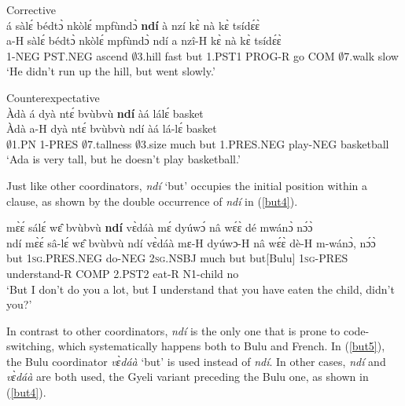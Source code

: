 \begin{exe}
\ex \label{but2} Corrective\\
  \glll     á sàlɛ́ bédtɔ̀ nkòlɛ́ mpfùndɔ̀ {\bfseries ndí} à nzí kɛ̀ nà kɛ̀ tsídɛ́ɛ̀ \\
              a-H sàlɛ́ bédtɔ̀ nkòlɛ́ mpfùndɔ̀ ndí a nzî-H kɛ̀ nà kɛ̀ tsídɛ́ɛ̀ \\
               1-NEG PST.NEG ascend $\emptyset$3.hill fast but 1.PST1 PROG-R go COM $\emptyset$7.walk slow \\
    \trans `He didn't run up the hill, but went slowly.'
\end{exe}

\begin{exe}
\ex \label{but3} Counterexpectative\\
  \glll     Àdà á dyà ntɛ́ bvùbvù {\bfseries ndí} àá lálɛ́ basket \\
              Àdà a-H dyà ntɛ́ bvùbvù ndí àá lá-lɛ́ basket \\
               $\emptyset$1.PN 1-PRES $\emptyset$7.tallness $\emptyset$3.size much but 1.PRES.NEG play-NEG basketball \\
    \trans `Ada is very tall, but he doesn't play basketball.'
\end {exe}

\noindent Just like other coordinators, {\itshape ndí} `but' occupies the initial position within a clause, as shown by the double occurrence of {\itshape ndí} in (\ref{but4}). 

\begin{exe} 
\ex\label{but4}
   mɛ̀ɛ́ sálɛ́ wɛ̂ bvùbvù {\bfseries ndí} vɛ̀dáà mɛ́ dyúwɔ́ nâ wɛ́ɛ̀ dé mwánɔ̀ nɔ́ɔ̀ \\
        ndí mɛ̀ɛ́ sâ-lɛ́ wɛ̂ bvùbvù ndí vɛ̀dáà mɛ-H dyúwɔ-H nâ wɛ́ɛ̀ dè-H m-wánɔ̀, nɔ́ɔ̀ \\
       but 1\textsc{sg}.PRES.NEG do-NEG 2\textsc{sg}.NSBJ much but but[Bulu] 1\textsc{sg}-PRES understand-R COMP 2.PST2 eat-R N1-child no  \\
    \trans `But I don't do you a lot, but I understand that you have eaten the child, didn't you?'
\end{exe}


In contrast to other coordinators, {\itshape ndí} is the only one that is prone to code-switching, which systematically happens both to Bulu and French. In (\ref{but5}), the Bulu coordinator {\itshape vɛ̀dáà} `but' is used instead of {\itshape ndí}. In other cases, {\itshape ndí} and {\itshape vɛ̀dáà} are both used, the Gyeli variant preceding the Bulu one, as shown in (\ref{but4}).



